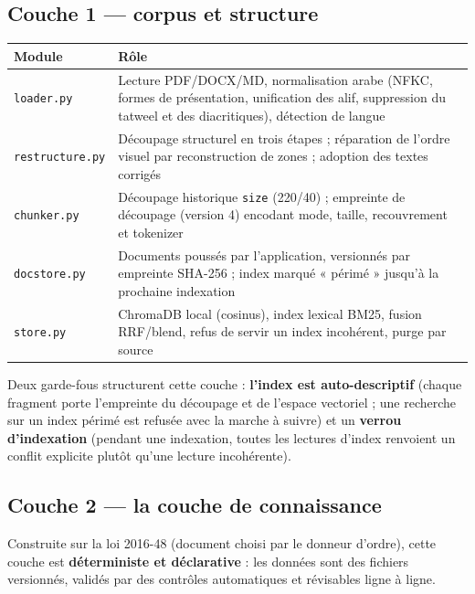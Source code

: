 \documentclass[a4paper,12pt]{report}
\begin{document}
\subsection{Couche 1 — corpus et structure}
\begin{table}[H]
\centering
\small
\begin{tabular}{p{3.0cm}p{11.5cm}}
\toprule
\textbf{Module} & \textbf{Rôle} \\
\midrule
\texttt{loader.py} & Lecture PDF/DOCX/MD, normalisation arabe (NFKC, formes de présentation,
unification des alif, suppression du tatweel et des diacritiques), détection de langue \\
\texttt{restructure.py} & Découpage structurel en trois étapes ; réparation de l'ordre visuel par
reconstruction de zones ; adoption des textes corrigés \\
\texttt{chunker.py} & Découpage historique \texttt{size} (220/40) ; empreinte de découpage
(version 4) encodant mode, taille, recouvrement et tokenizer \\
\texttt{docstore.py} & Documents poussés par l'application, versionnés par empreinte SHA-256 ;
index marqué « périmé » jusqu'à la prochaine indexation \\
\texttt{store.py} & ChromaDB local (cosinus), index lexical BM25, fusion RRF/blend, refus de
servir un index incohérent, purge par source \\
\bottomrule
\end{tabular}
\end{table}

Deux garde-fous structurent cette couche : \textbf{l'index est auto-descriptif} (chaque fragment
porte l'empreinte du découpage et de l'espace vectoriel ; une recherche sur un index périmé est
refusée avec la marche à suivre) et un \textbf{verrou d'indexation} (pendant une indexation, toutes
les lectures d'index renvoient un conflit explicite plutôt qu'une lecture incohérente).

\subsection{Couche 2 — la couche de connaissance}
Construite sur la loi 2016-48 (document choisi par le donneur d'ordre), cette couche est
\textbf{déterministe et déclarative} : les données sont des fichiers versionnés, validés par des
contrôles automatiques et révisables ligne à ligne.
\end{document}
